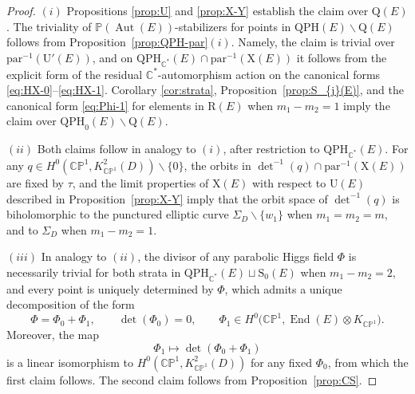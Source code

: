 \documentclass[pdftex]{sigma}
\newcommand{\field}[1]{\ensuremath{\mathbb{#1}}}
\newcommand{\CC}{\field{C}}
\newcommand{\PP}{\field{P}}
\DeclareMathOperator{\Aut}{Aut}
\DeclareMathOperator{\End}{End}
\numberwithin{equation}{section}
\begin{document}
\begin{proof}
$(i)$ Propositions \ref{prop:U} and \ref{prop:X-Y} establish the claim over $\mathrm{Q}(E)$. The triviality of $\PP(\Aut(E))$-stabilizers for points in $\mathrm{QPH}(E)\backslash\mathrm{Q}(E)$ follows from Proposition~\ref{prop:QPH-par}$(i)$. Namely, the claim is trivial over $\mathrm{par}^{-1}(\mathrm{U}'(E))$, and on $\mathrm{QPH}_{\CC^{*}}(E)\cap\mathrm{par}^{-1}(\mathrm{X}(E))$ it follows from the explicit form of the residual $\CC^{*}$-automorphism action on the canonical forms \eqref{eq:HX-0}--\eqref{eq:HX-1}. Corollary \ref{cor:strata}, Proposition~\ref{prop:S_{j}(E)}, and the canonical form \eqref{eq:Phi-1} for elements in $\mathrm{R}(E)$ when $m_{1}-m_{2}=1$ imply the claim over $\mathrm{QPH}_{0}(E)\backslash\mathrm{Q}(E)$.

$(ii)$ Both claims follow in analogy to $(i)$, after restriction to $\mathrm{QPH}_{\CC^{*}}(E)$. For any $q\in H^{0}(\CC\PP^{1},K^{2}_{\CC\PP^{1}}(D))\backslash\{0\}$, the orbits in $\det^{-1}(q)\cap\mathrm{par}^{-1}(\mathrm{X}(E))$ are fixed by $\tau$, and the limit properties of $\mathrm{X}(E)$ with respect to $\mathrm{U}(E)$ described in Proposition~\ref{prop:X-Y} imply that the orbit space of $\det^{-1}(q)$ is biholomorphic to the punctured elliptic curve $\Sigma_{D}\backslash\{w_{1}\}$ when $m_{1}=m_{2}=m$, and to $\Sigma_{D}$ when $m_{1}-m_{2}=1$.

$(iii)$ In analogy to $(ii)$, the divisor of any parabolic Higgs field $\Phi$ is necessarily trivial for both strata in $\mathrm{QPH}_{\CC^{*}}(E)\sqcup \mathrm{S}_{0}(E)$ when $m_{1} - m_{2} = 2$, and every point is uniquely determined by $\Phi$, which admits a unique decomposition of the form
\[
\Phi = \Phi_{0} + \Phi_{1},\qquad
\det(\Phi_{0})=0,\qquad
\Phi_{1}\in H^{0}\bigl(\CC\PP^{1},\End(E)\otimes K_{\CC\PP^{1}}\bigr).
\]
Moreover, the map
\[
\Phi_{1}\mapsto \det(\Phi_{0}+ \Phi_{1})
\]
is a linear isomorphism to $H^{0}(\CC\PP^{1},K^{2}_{\CC\PP^{1}}(D))$ for any fixed $\Phi_{0}$, from which the first claim follows. The second claim follows from Proposition~\ref{prop:CS}.
\end{proof}
\end{document}
